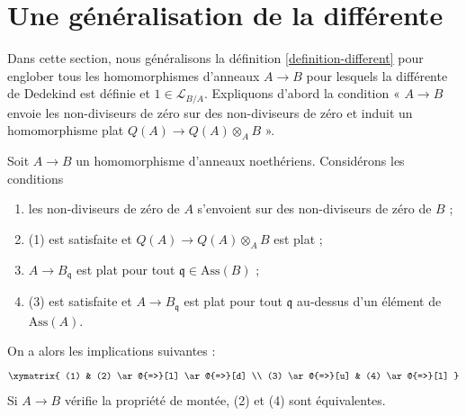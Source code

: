 \section{Une généralisation de la différente}
\label{section-different-generalization}

\noindent
Dans cette section, nous généralisons la définition \ref{definition-different}
pour englober tous les homomorphismes d'anneaux $A \to B$
pour lesquels la différente de Dedekind est définie et $1 \in \mathcal{L}_{B/A}$.
Expliquons d'abord la condition « $A \to B$ envoie les non-diviseurs de zéro sur
des non-diviseurs de zéro et induit un homomorphisme plat $Q(A) \to Q(A) \otimes_A B$ ».

\begin{lemma}
\label{lemma-explain-condition}
Soit $A \to B$ un homomorphisme d'anneaux noethériens. Considérons les conditions
\begin{enumerate}
\item les non-diviseurs de zéro de $A$ s'envoient sur des non-diviseurs de zéro de $B$ ;
\item (1) est satisfaite et $Q(A) \to Q(A) \otimes_A B$ est plat ;
\item $A \to B_\mathfrak q$ est plat pour tout
$\mathfrak q \in \text{Ass}(B)$ ;
\item (3) est satisfaite et $A \to B_\mathfrak q$ est plat pour tout $\mathfrak q$
au-dessus d'un élément de $\text{Ass}(A)$.
\end{enumerate}
On a alors les implications suivantes :
$$
\xymatrix{
(1) & (2) \ar@{=>}[l] \ar@{=>}[d] \\
(3) \ar@{=>}[u] & (4) \ar@{=>}[l]
}
$$
Si $A \to B$ vérifie la propriété de montée, (2) et (4) sont équivalentes.
\end{lemma}

